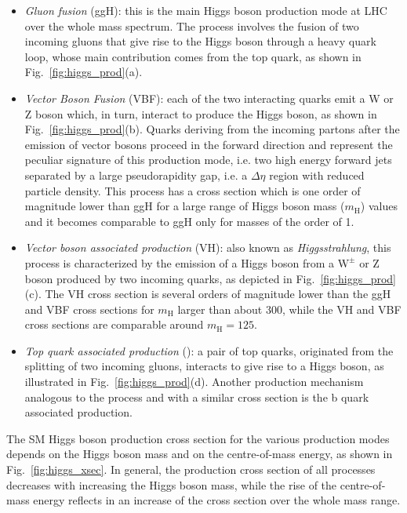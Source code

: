 \begin{itemize}
\item \emph{Gluon fusion} (ggH): this is the main Higgs boson production mode at LHC over the whole mass spectrum. The process involves the fusion of two incoming gluons that give rise to the Higgs boson through a heavy quark loop, whose main contribution comes from the top quark, as shown in Fig.~\ref{fig:higgs_prod}(a).

\item \emph{Vector Boson Fusion} (VBF): each of the two interacting quarks emit a W or Z boson which, in turn, interact to produce the Higgs boson, as shown in Fig.~\ref{fig:higgs_prod}(b). Quarks deriving from the incoming partons after the emission of vector bosons proceed in the forward direction and represent the peculiar signature of this production mode, i.e. two high energy forward jets separated by a large pseudorapidity gap, i.e. a $\Delta\eta$ region with reduced particle density. This process has a cross section which is one order of magnitude lower than ggH for a large range of Higgs boson mass ($m_\mathrm{H}$) values and it becomes comparable to ggH only for masses of the order of 1\TeV.

\item \emph{Vector boson associated production} (VH): also known as \emph{Higgsstrahlung}, this process is characterized by the emission of a Higgs boson from a $\mathrm{W}^\pm$ or Z boson produced by two incoming quarks, as depicted in Fig.~\ref{fig:higgs_prod}(c). The VH cross section is several orders of magnitude lower than the ggH and VBF cross sections for $m_\mathrm{H}$ larger than about 300\GeV, while the VH and VBF cross sections are comparable around $m_\mathrm{H} = 125$\GeV.

\item \emph{Top quark associated production} (\ttH): a pair of top quarks, originated from the splitting of two incoming gluons, interacts to give rise to a Higgs boson, as illustrated in Fig.~\ref{fig:higgs_prod}(d). Another production mechanism analogous to the \ttH process and with a similar cross section is the b quark associated production.
\end{itemize}

The SM Higgs boson production cross section for the various production modes depends on the Higgs boson mass and on the centre-of-mass energy, as shown in Fig.~\ref{fig:higgs_xsec}. In general, the production cross section of all processes decreases with increasing the Higgs boson mass, while the rise of the centre-of-mass energy reflects in an increase of the cross section over the whole mass range.

